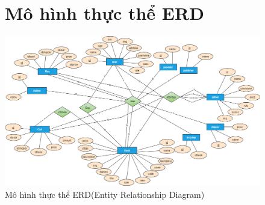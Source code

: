 \documentclass{report}
\begin{document}
\begin{center}
    \begin{figure}[htp]
        \section{Mô hình thực thể ERD}
        \begin{center}
            \includegraphics[scale = 0.44]{image/ERD.PNG}
        \end{center}
        \caption{Mô hình thực thể ERD(Entity Relationship Diagram)}
    \end{figure}
\end{center}
\end{document}
